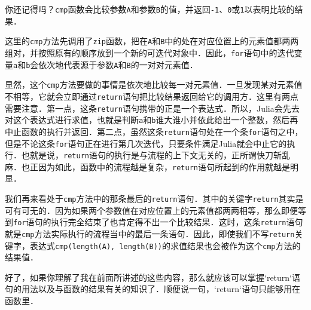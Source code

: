 你还记得吗？\verb|cmp|函数会比较参数\verb|A|和参数\verb|B|的值，并返回\verb|-1|、\verb|0|或\verb|1|以表明比较的结果．

这里的\verb|cmp|方法先调用了\verb|zip|函数，把在\verb|A|和\verb|B|中的处在对应位置上的元素值都两两组对，并按照原有的顺序放到一个新的可迭代对象中．因此，\verb|for|语句中的迭代变量\verb|a|和\verb|b|会依次地代表源于参数\verb|A|和\verb|B|的一对对元素值．

显然，这个\verb|cmp|方法要做的事情是依次地比较每一对元素值．一旦发现某对元素值不相等，它就会立即通过\verb|return|语句把比较结果返回给它的调用方．这里有两点需要注意．第一点，这条\verb|return|语句携带的正是一个表达式．所以，Julia会先去对这个表达式进行求值，也就是判断\verb|a|和\verb|b|谁大谁小并依此给出一个整数，然后再中止函数的执行并返回．第二点，虽然这条\verb|return|语句处在一个条\verb|for|语句之中，但是不论这条\verb|for|语句正在进行第几次迭代，只要条件满足Julia就会中止它的执行．也就是说，\verb|return|语句的执行是与流程的上下文无关的，正所谓快刀斩乱麻．也正因为如此，函数中的流程越是复杂，\verb|return|语句所起到的作用就越是明显．

我们再来看处于\verb|cmp|方法中的那条最后的\verb|return|语句．其中的关键字\verb|return|其实是可有可无的．因为如果两个参数值在对应位置上的元素值都两两相等，那么即便等到\verb|for|语句的执行完全结束了也肯定得不出一个比较结果．这时，这条\verb|return|语句就是\verb|cmp|方法实际执行的流程当中的最后一条语句．因此，即使我们不写\verb|return|关键字，表达式\verb|cmp(length(A), length(B))|的求值结果也会被作为这个\verb|cmp|方法的结果值．

好了，如果你理解了我在前面所讲述的这些内容，那么就应该可以掌握`return`语句的用法以及与函数的结果有关的知识了．顺便说一句，`return`语句只能够用在函数里．